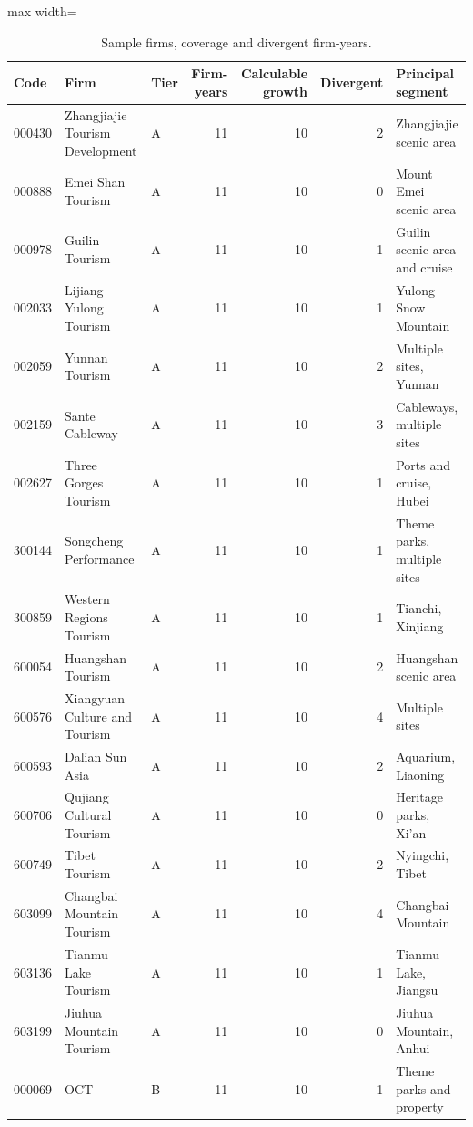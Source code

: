 \documentclass[review,3p,times]{elsarticle}
\begin{document}
\begin{table}[!htbp]
\centering
\renewcommand{\thetable}{A1}
\caption{Sample firms, coverage and divergent firm-years.}\label{tab:A1}
\begin{minipage}{\textwidth}
\centering
\footnotesize
\begin{adjustbox}{max width=\textwidth}
\begin{tabular}{@{}lllrrrl@{}}
\toprule
Code & Firm & Tier & Firm-years & Calculable growth & Divergent & Principal segment \\
\midrule
000430 & Zhangjiajie Tourism Development & A & 11 & 10 & 2 & Zhangjiajie scenic area \\
000888 & Emei Shan Tourism & A & 11 & 10 & 0 & Mount Emei scenic area \\
000978 & Guilin Tourism & A & 11 & 10 & 1 & Guilin scenic area and cruise \\
002033 & Lijiang Yulong Tourism & A & 11 & 10 & 1 & Yulong Snow Mountain \\
002059 & Yunnan Tourism & A & 11 & 10 & 2 & Multiple sites, Yunnan \\
002159 & Sante Cableway & A & 11 & 10 & 3 & Cableways, multiple sites \\
002627 & Three Gorges Tourism & A & 11 & 10 & 1 & Ports and cruise, Hubei \\
300144 & Songcheng Performance & A & 11 & 10 & 1 & Theme parks, multiple sites \\
300859 & Western Regions Tourism & A & 11 & 10 & 1 & Tianchi, Xinjiang \\
600054 & Huangshan Tourism & A & 11 & 10 & 2 & Huangshan scenic area \\
600576 & Xiangyuan Culture and Tourism & A & 11 & 10 & 4 & Multiple sites \\
600593 & Dalian Sun Asia & A & 11 & 10 & 2 & Aquarium, Liaoning \\
600706 & Qujiang Cultural Tourism & A & 11 & 10 & 0 & Heritage parks, Xi'an \\
600749 & Tibet Tourism & A & 11 & 10 & 2 & Nyingchi, Tibet \\
603099 & Changbai Mountain Tourism & A & 11 & 10 & 4 & Changbai Mountain \\
603136 & Tianmu Lake Tourism & A & 11 & 10 & 1 & Tianmu Lake, Jiangsu \\
603199 & Jiuhua Mountain Tourism & A & 11 & 10 & 0 & Jiuhua Mountain, Anhui \\
000069 & OCT & B & 11 & 10 & 1 & Theme parks and property \\

\end{tabular}
\end{adjustbox}
\end{minipage}
\end{table}
\end{document}
